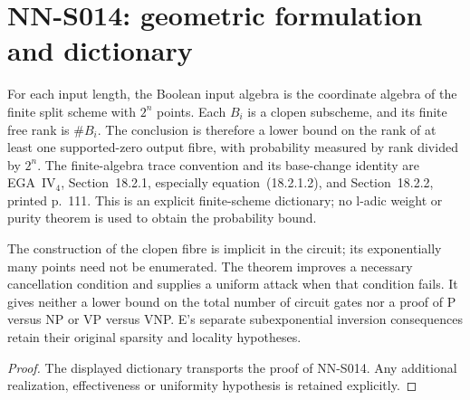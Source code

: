 \section{NN-S014: geometric formulation and dictionary}
\begin{geometricstatement}[NN-S014]
For each input length, the Boolean input algebra is the coordinate
algebra of the finite split scheme with $2^n$ points. Each $B_i$ is a
clopen subscheme, and its finite free rank is $\#B_i$.
The conclusion is therefore a lower bound on the rank of at least one
supported-zero output fibre, with probability measured by rank divided
by $2^n$. The finite-algebra trace convention and its base-change
identity are EGA~IV$_4$, Section~18.2.1, especially equation~(18.2.1.2),
and Section~18.2.2, printed p.~111. This is an explicit finite-scheme
dictionary; no l-adic weight or purity theorem is used to obtain the
probability bound.

The construction of the clopen fibre is implicit in the circuit;
its exponentially many points need not be enumerated. The theorem
improves a necessary cancellation condition and supplies a uniform
attack when that condition fails. It gives neither a lower bound on
the total number of circuit gates nor a proof of P versus NP or
VP versus VNP. E's separate subexponential inversion consequences
retain their original sparsity and locality hypotheses.
\end{geometricstatement}
\begin{proof} The displayed dictionary transports the proof of NN-S014. Any additional realization, effectiveness or uniformity hypothesis is retained explicitly.\end{proof}


